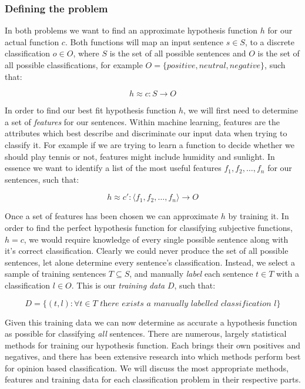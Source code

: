 \subsubsection{Defining the problem}

In both problems we want to find an approximate hypothesis function $h$ for our actual function $c$. Both functions will map an input sentence $s\in S$, to a discrete classification $o\in O$, where $S$ is the set of all possible sentences and $O$ is the set of all possible classifications, for example $O=\{positive, neutral, negative\}$, such that:

\begin{equation}
	h \approx c:S \rightarrow O
\end{equation}

In order to find our best fit hypothesis function $h$, we will first need to determine a set of \emph{features} for our sentences. Within machine learning, features are the attributes which best describe and discriminate our input data when trying to classify it. For example if we are trying to learn a function to decide whether we should play tennis or not, features might include humidity and sunlight. In essence we want to identify a list of the most useful features $f_1, f_2,\dots,f_n$ for our sentences, such that:
	
\begin{equation}
	h \approx c' : \langle f_1, f_2,\dots,f_n \rangle \rightarrow O
\end{equation}

Once a set of features has been chosen we can approximate $h$ by training it. In order to find the perfect hypothesis function for classifying subjective functions, $h=c$, we would require knowledge of every single possible sentence along with it's correct classification. Clearly we could never produce the set of all possible sentences, let alone determine every sentence's classification. Instead, we select a sample of training sentences $T \subseteq S$, and manually \emph{label} each sentence $t \in T$ with a classification $l \in O$. This is our \emph{training data} $D$, such that:

\begin{equation}
	D = \{(t, l) : \forall t \in T \textit{ there exists a manually labelled classification $l$} \}
\end{equation}

Given this training data we can now determine as accurate a hypothesis function as possible for classifying \emph{all} sentences. There are numerous, largely statistical methods for training our hypothesis function. Each brings their own positives and negatives, and there has been extensive research \cite{Pang:2004us} into which methods perform best for opinion based classification. We will discuss the most appropriate methods, features and training data for each classification problem in their respective parts.

